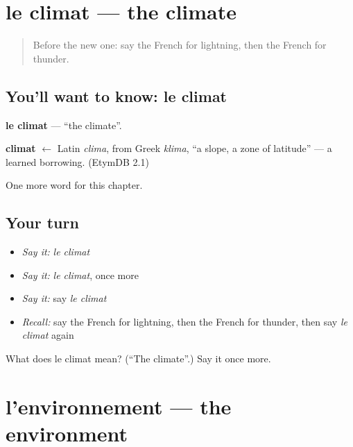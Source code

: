 \section[le climat]{le climat — the climate}

\label{lesson:FR-C229-climat}



\begin{quote}
Before the new one: say the French for lightning, then the French for thunder.
\end{quote}

\subsection*{You'll want to know: le climat}
\textbf{le climat} — \textquotedblleft{}the climate\textquotedblright{}.

\begin{cousinweb}
\textbf{climat} $\leftarrow$ Latin \emph{clima}, from Greek \emph{klima}, \textquotedblleft{}a slope, a zone of latitude\textquotedblright{} — a learned borrowing. (EtymDB 2.1)
\end{cousinweb}

\begin{grammarlens}[title={What you've built}]
One more word for this chapter.
\end{grammarlens}

\subsection*{Your turn}
\begin{itemize}
\raggedright
  \item \emph{Say it:} \emph{le climat}
  \item \emph{Say it:} \emph{le climat}, once more
  \item \emph{Say it:} say \emph{le climat}
  \item \emph{Recall:} say the French for lightning, then the French for thunder, then say \emph{le climat} again
\end{itemize}

\begin{tcolorbox}[breakable,colback=teal!4,colframe=teal!35!black,title={Before you move on}]
What does le climat mean? (\textquotedblleft{}The climate\textquotedblright{}.) Say it once more.
\end{tcolorbox}
\section[l'environnement]{l'environnement — the environment}

